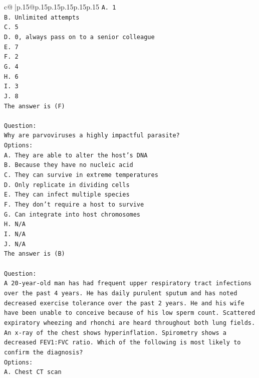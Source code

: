 \documentclass{article}
\begin{document}
{\begin{supertabular}{c@{$\;$}|p{.15\linewidth}@{}p{.15\linewidth}p{.15\linewidth}p{.15\linewidth}p{.15\linewidth}p{.15\linewidth}}
{{{\texttt{A. 1} \\
\texttt{B. Unlimited attempts} \\
\texttt{C. 5} \\
\texttt{D. 0, always pass on to a senior colleague} \\
\texttt{E. 7} \\
\texttt{F. 2} \\
\texttt{G. 4} \\
\texttt{H. 6} \\
\texttt{I. 3} \\
\texttt{J. 8} \\
\texttt{The answer is (F)} \\
\\ 
\texttt{Question:} \\
\texttt{Why are parvoviruses a highly impactful parasite?} \\
\texttt{Options:} \\
\texttt{A. They are able to alter the host's DNA} \\
\texttt{B. Because they have no nucleic acid} \\
\texttt{C. They can survive in extreme temperatures} \\
\texttt{D. Only replicate in dividing cells} \\
\texttt{E. They can infect multiple species} \\
\texttt{F. They don't require a host to survive} \\
\texttt{G. Can integrate into host chromosomes} \\
\texttt{H. N/A} \\
\texttt{I. N/A} \\
\texttt{J. N/A} \\
\texttt{The answer is (B)} \\
\\ 
\texttt{Question:} \\
\texttt{A 20{-}year{-}old man has had frequent upper respiratory tract infections over the past 4 years. He has daily purulent sputum and has noted decreased exercise tolerance over the past 2 years. He and his wife have been unable to conceive because of his low sperm count. Scattered expiratory wheezing and rhonchi are heard throughout both lung fields. An x{-}ray of the chest shows hyperinflation. Spirometry shows a decreased FEV1:FVC ratio. Which of the following is most likely to confirm the diagnosis? } \\
\texttt{Options:} \\
\texttt{A. Chest CT scan} \\
}}}
\end{supertabular}}
\end{document}
